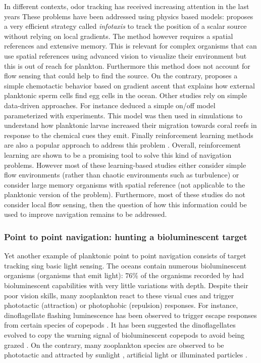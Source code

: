 In different contexts, odor tracking has received increasing attention in the last years
These problems have been addressed using physics based models: \citet{vergassola2007infotaxis} proposes a very efficient strategy called \textit{infotaxis} to track the position of a scalar source without relying on local gradients.
The method however requires a spatial references and extensive memory.
This is relevant for complex organisms that can use spatial references using advanced vision to visualize their environment but this is out of reach for plankton.
Furthermore this method does not account for flow sensing that could help to find the source.
On the contrary, \citet{lange2021sperm} proposes a simple chemotactic behavior based on gradient ascent that explains how external planktonic sperm cells find egg cells in the ocean.
Other studies rely on simple data-driven approaches. For instance \citet{koehl2007individual} deduced a simple on/off model parameterized with experiments.
This model was then used in simulations to understand how planktonic larvae increased their migration towards coral reefs in response to the chemical cues they emit.
Finally reinforcement learning methods are also a popular approach to address this problem \citep{lu2011learning, fischer2017odor, liberzon2018moth, jing2021recent, loisy2022searching, rigolli2022learning}.
Overall, reinforcement learning are shown to be a promising tool to solve this kind of navigation problems.
However most of these learning-based studies either consider simple flow environments (rather than chaotic environments such as turbulence) or consider large memory organisms with spatial reference (not applicable to the planktonic version of the problem).
Furthermore, most of these studies do not consider local flow sensing, then the question of how this information could be used to improve navigation remains to be addressed.

\subsubsection{Point to point navigation: hunting a bioluminescent target}

Yet another example of planktonic point to point navigation consists of target tracking sing basic light sensing.
The oceans contain numerous bioluminescent organisms (organisms that emit light): $76\%$ of the organisms recorded by \citet{martini2017quantification} had bioluminescent capabilities with very little variations with depth.
Despite their poor vision skills, many zooplankton react to these visual cues and trigger phototactic (attraction) or photophobic (repulsion) responses.
For instance, dinoflagellate flashing luminescence has been observed to trigger escape responses from certain species of copepods \citep{buskey1983behavioral}.
It has been suggested the dinoflagellates evolved to copy the warning signal of bioluminescent copepods to avoid being grazed \citep{buskey1985behavioral}.
On the contrary, many zooplankton species are observed to be phototactic and attracted by sunlight \citep{ringelberg1999photobehaviour}, artificial light \citep{jekely2008mechanism, krafft2021antarctic, stearns1984photosensitivity} or illuminated particles \citep{tanaka2019biased}.

